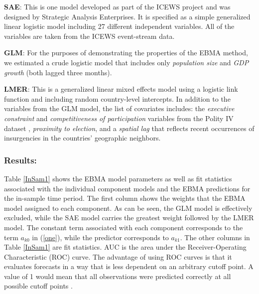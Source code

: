 \begin{list}{}{\leftmargin=1em}
\item \textbf{SAE}: This is one model developed as part of the ICEWS
  project and was designed by Strategic Analysis Enterprises. It is
  specified as a simple generalized linear logistic model including 27 different
  independent variables.  All of the variables are taken from the ICEWS
  event-stream data.
\item \textbf{GLM}: For the purposes of demonstrating the properties
  of the EBMA method, we estimated a crude logistic model that
  includes only \textit{population size} and \textit{GDP growth} (both
  lagged three months).         								%
\item \textbf{LMER}: This is a generalized linear mixed effects model  %
  using a logistic link function and including random country-level     %
  intercepts. In addition to the variables from the GLM model, the      %
  list of covariates includes: the \textit{executive constraint} and  %
    \textit{competitiveness of participation} variables from the Polity  %
  IV dataset \citep{PolityIV}, \textit{proximity to
    election}, and a
  \textit{spatial lag} that reflects recent occurrences of
  insurgencies in the countries' geographic
  neighbors.
\end{list}

\subsubsection{Results:}

Table \ref{InSam1} shows the EBMA model parameters as well as fit
statistics associated with the individual component models and the
EBMA predictions for the in-sample time period. The first column shows
the weights that the EBMA model assigned to each component. As can be
seen, the GLM model is effectively excluded, while the SAE model
carries the greatest weight followed by the LMER model.  The constant
term associated with each component corresponds to the term $a_{k0}$
in (\ref{one}), while the predictor corresponds to $a_{k1}$.
The other columns in Table \ref{InSam1} are fit statistics.  AUC is
the area under the Receiver-Operating Characteristic (ROC) curve. The
advantage of using ROC curves is that it evaluates forecasts in a way
that is less dependent on an arbitrary cutoff point.  A value of 1
would mean that all observations were predicted correctly at all
possible cutoff points \citep{King:Zeng:2001}.

